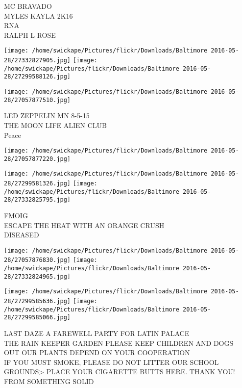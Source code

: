 \documentclass[10pt,letterpaper]{article}
\begin{document}
MC BRAVADO\\
MYLES KAYLA 2K16\\
RNA\\
RALPH L ROSE\\
\pagebreak

\texttt{[image: /home/swickape/Pictures/flickr/Downloads/Baltimore 2016-05-28/27332827905.jpg]}
\texttt{[image: /home/swickape/Pictures/flickr/Downloads/Baltimore 2016-05-28/27299588126.jpg]}

\texttt{[image: /home/swickape/Pictures/flickr/Downloads/Baltimore 2016-05-28/27057877510.jpg]}

LED ZEPPELIN MN 8{-}5{-}15\\
THE MOON LIFE ALIEN CLUB\\
Peace\\
\pagebreak

\texttt{[image: /home/swickape/Pictures/flickr/Downloads/Baltimore 2016-05-28/27057877220.jpg]}

\vspace{0.25in}
\texttt{[image: /home/swickape/Pictures/flickr/Downloads/Baltimore 2016-05-28/27299581326.jpg]}
\texttt{[image: /home/swickape/Pictures/flickr/Downloads/Baltimore 2016-05-28/27332825795.jpg]}

FMOIG\\
ESCAPE THE HEAT WITH AN ORANGE CRUSH\\
DISEASED\\
\pagebreak

\texttt{[image: /home/swickape/Pictures/flickr/Downloads/Baltimore 2016-05-28/27057876830.jpg]}
\texttt{[image: /home/swickape/Pictures/flickr/Downloads/Baltimore 2016-05-28/27332824965.jpg]}

\texttt{[image: /home/swickape/Pictures/flickr/Downloads/Baltimore 2016-05-28/27299585636.jpg]}
\texttt{[image: /home/swickape/Pictures/flickr/Downloads/Baltimore 2016-05-28/27299585066.jpg]}

LAST DAZE A FAREWELL PARTY FOR LATIN PALACE\\
THE RAIN KEEPER GARDEN PLEASE KEEP CHILDREN AND DOGS OUT OUR PLANTS DEPEND ON YOUR COOPERATION\\
IF YOU MUST SMOKE, PLEASE DO NOT LITTER OUR SCHOOL GROUNDS>  PLACE YOUR CIGARETTE BUTTS HERE.  THANK YOU!\\
FROM SOMETHING SOLID\\
\pagebreak
\end{document}
